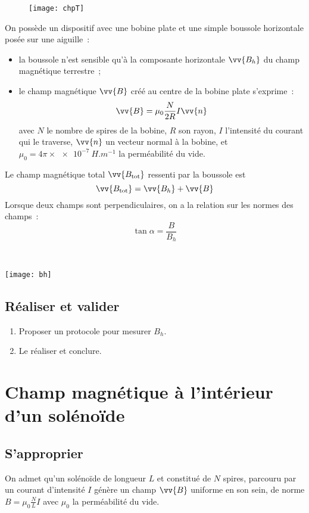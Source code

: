 \documentclass[a4paper, 11pt, final, garamond]{book}
\begin{document}
\begin{figure}[h]
  \centering
  \texttt{[image: chpT]}
  \label{fig:chpT}
\end{figure}
On possède un dispositif avec une bobine plate et une simple boussole
horizontale posée sur une aiguille~:
\begin{itemize}[label=$\diamond$, leftmargin=10pt]
  \item la boussole n'est sensible qu'à la composante horizontale $\vv{B_h}$ du
    champ magnétique terrestre~;
  \item le champ magnétique $\vv{B}$ créé au centre de la bobine plate
    s'exprime~:
    \[
      \vv{B} = \mu_0 \frac{N}{2R}I \vv{n}
    \]
    avec $N$ le nombre de spires de la bobine, $R$ son rayon, $I$ l'intensité du
    courant qui le traverse, $\vv{n}$ un vecteur normal à la bobine, et $\mu_0 =
    4\pi\times \SI{e-7}{H.m ^{-1}}$ la perméabilité du vide.
\end{itemize}
\noindent
\begin{minipage}[t]{.7\linewidth}
  Le champ magnétique total $\vv{B_{\rm tot}}$ ressenti par la boussole est
  \[
    \vv{B_{\rm tot}} = \vv{B_h} + \vv{B}
  \]
  Lorsque deux champs sont perpendiculaires, on a la relation sur les normes des
  champs~:
  \[
    \tan{\alpha} = \frac{B}{B_h}
  \]
\end{minipage}
\hfill
\begin{minipage}[t]{.25\linewidth}
  ~
  \begin{center}
    \texttt{[image: bh]}
    \label{fig:bh}
  \end{center}
\end{minipage}

\subsection{Réaliser et valider}
\label{ssec:chpTreal}

\begin{enumerate}[label=\sqenumi]
  \item Proposer un protocole pour mesurer $B_h$.
  \item Le réaliser et conclure.
\end{enumerate}

\section{Champ magnétique à l'intérieur d'un solénoïde}
\label{sec:sol}
\subsection{S'approprier}
\label{ssec:solapp}
On admet qu'un solénoïde de longueur $L$ et constitué de $N$ spires, parcouru
par un courant d'intensité $I$ génère un champ $\vv{B}$ uniforme en son sein, de
norme $B = \mu_0 \frac{N}{L}I$ avec $\mu_0$ la perméabilité du vide.
\end{document}
